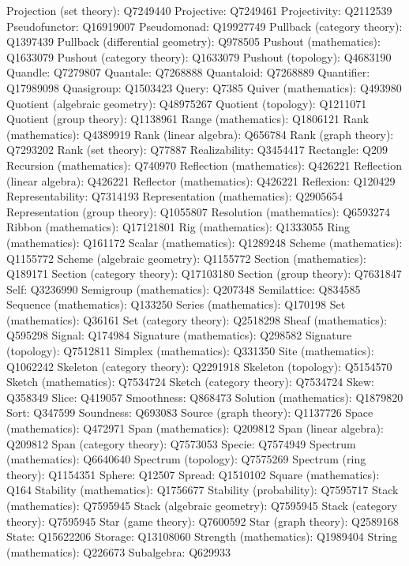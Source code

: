 Projection (set theory): Q7249440
Projective: Q7249461
Projectivity: Q2112539
Pseudofunctor: Q16919007
Pseudomonad: Q19927749
Pullback (category theory): Q1397439
Pullback (differential geometry): Q978505
Pushout (mathematics): Q1633079
Pushout (category theory): Q1633079
Pushout (topology): Q4683190
Quandle: Q7279807
Quantale: Q7268888
Quantaloid: Q7268889
Quantifier: Q17989098
Quasigroup: Q1503423
Query: Q7385
Quiver (mathematics): Q493980
Quotient (algebraic geometry): Q48975267
Quotient (topology): Q1211071
Quotient (group theory): Q1138961
Range (mathematics): Q1806121
Rank (mathematics): Q4389919
Rank (linear algebra): Q656784
Rank (graph theory): Q7293202
Rank (set theory): Q77887
Realizability: Q3454417
Rectangle: Q209
Recursion (mathematics): Q740970
Reflection (mathematics): Q426221
Reflection (linear algebra): Q426221
Reflector (mathematics): Q426221
Reflexion: Q120429
Representability: Q7314193
Representation (mathematics): Q2905654
Representation (group theory): Q1055807
Resolution (mathematics): Q6593274
Ribbon (mathematics): Q17121801
Rig (mathematics): Q1333055
Ring (mathematics): Q161172
Scalar (mathematics): Q1289248
Scheme (mathematics): Q1155772
Scheme (algebraic geometry): Q1155772
Section (mathematics): Q189171
Section (category theory): Q17103180
Section (group theory): Q7631847
Self: Q3236990
Semigroup (mathematics): Q207348
Semilattice: Q834585
Sequence (mathematics): Q133250
Series (mathematics): Q170198
Set (mathematics): Q36161
Set (category theory): Q2518298
Sheaf (mathematics): Q595298
Signal: Q174984
Signature (mathematics): Q298582
Signature (topology): Q7512811
Simplex (mathematics): Q331350
Site (mathematics): Q1062242
Skeleton (category theory): Q2291918
Skeleton (topology): Q5154570
Sketch (mathematics): Q7534724
Sketch (category theory): Q7534724
Skew: Q358349
Slice: Q419057
Smoothness: Q868473
Solution (mathematics): Q1879820
Sort: Q347599
Soundness: Q693083
Source (graph theory): Q1137726
Space (mathematics): Q472971
Span (mathematics): Q209812
Span (linear algebra): Q209812
Span (category theory): Q7573053
Specie: Q7574949
Spectrum (mathematics): Q6640640
Spectrum (topology): Q7575269
Spectrum (ring theory): Q1154351
Sphere: Q12507
Spread: Q1510102
Square (mathematics): Q164
Stability (mathematics): Q1756677
Stability (probability): Q7595717
Stack (mathematics): Q7595945
Stack (algebraic geometry): Q7595945
Stack (category theory): Q7595945
Star (game theory): Q7600592
Star (graph theory): Q2589168
State: Q15622206
Storage: Q13108060
Strength (mathematics): Q1989404
String (mathematics): Q226673
Subalgebra: Q629933
